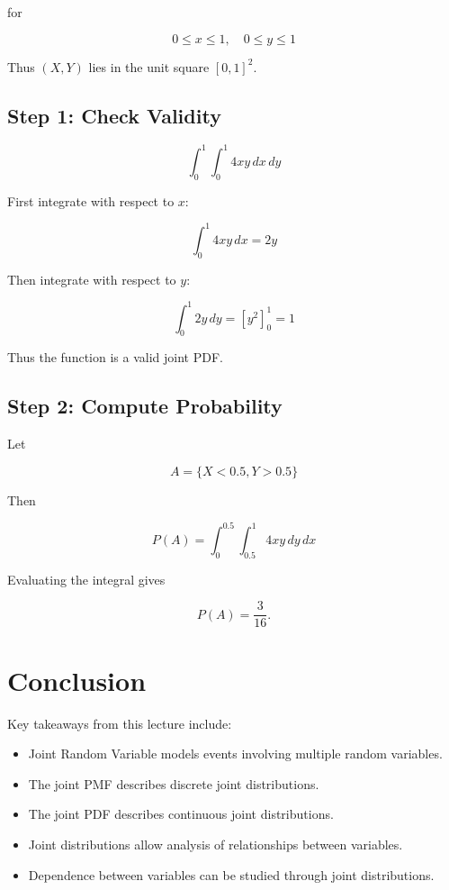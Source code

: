 \documentclass[12pt]{article}
\begin{document}
for

\[
0 \le x \le 1, \quad 0 \le y \le 1
\]

Thus $(X,Y)$ lies in the unit square $[0,1]^2$.

\subsection{Step 1: Check Validity}

\[
\int_0^1 \int_0^1 4xy \, dx\,dy
\]

First integrate with respect to $x$:

\[
\int_0^1 4xy\,dx = 2y
\]

Then integrate with respect to $y$:

\[
\int_0^1 2y\,dy = [y^2]_0^1 = 1
\]

Thus the function is a valid joint PDF.

\subsection{Step 2: Compute Probability}

Let

\[
A = \{X < 0.5, Y > 0.5\}
\]

Then

\[
P(A) = \int_0^{0.5} \int_{0.5}^{1} 4xy\,dy\,dx
\]

Evaluating the integral gives

\[
P(A) = \frac{3}{16}.
\]

\section{Conclusion}

Key takeaways from this lecture include:

\begin{itemize}
\item Joint Random Variable models events involving multiple random variables.
\item The joint PMF describes discrete joint distributions.
\item The joint PDF describes continuous joint distributions.
\item Joint distributions allow analysis of relationships between variables.
\item Dependence between variables can be studied through joint distributions.
\end{itemize}
\end{document}
